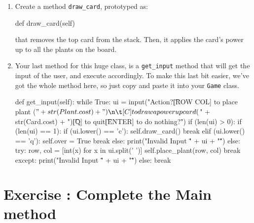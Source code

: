 \documentclass{42-en}
\begin{document}
\makeheaderfiles
        \begin{enumerate}\itemsep7pt
\item Create a method \texttt{draw\_card}, prototyped as:
\begin{42pycode}
def draw_card(self)
\end{42pycode}
    that removes the top card from the stack. Then, it applies the card's power up to all the plants on the board.
    \newpage
\item Your last method for this huge class, is a \texttt{get\_input} method that will get the input of the user, and execute accordingly. To make this last bit easier,
we've got the whole method here, so just copy and paste it into your \texttt{Game} class.
\begin{42pycode}
def get_input(self):
		while True:
			ui = input("Action?\n\t[ROW COL] to place plant ($" +
						str(Plant.cost) +
						")\n\t[C] to draw a powerup card ($" +
						str(Card.cost) +
						")\n\t[Q] to quit\n\t[ENTER] to do nothing?\n")
			if (len(ui) > 0):
				if (len(ui) == 1):
					if (ui.lower() == 'c'):
						self.draw_card()
						break
					elif (ui.lower() == 'q'):
						self.over = True
						break
					else:
						print("Invalid Input \"" + ui + "\"")
				else:
					try:
						row, col = [int(x) for x in ui.split(' ')]
						self.place_plant(row, col)
						break
					except:
						print("Invalid Input \"" + ui + "\"")
			else:
				break
\end{42pycode}
\end{enumerate}
\nextexercice
 \chapter{Exercise \exercicenumber: Complete the Main method}

\exnumber{\exercicenumber}
\end{document}
